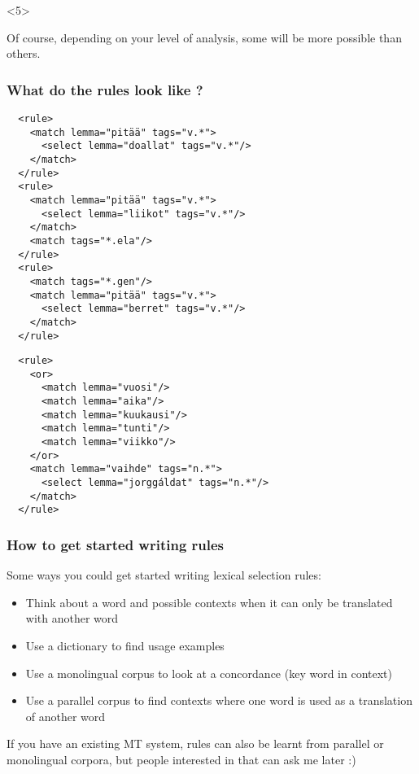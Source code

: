 \documentclass[10pt,xetex]{beamer} %
\begin{document}
\begin{frame}
\begin{onlyenv}<5>

Of course, depending on your level of analysis, some will be more possible than others.

\end{onlyenv}
\end{frame}

\begin{frame}[fragile]
  \frametitle{What do the rules look like ? }
\begin{multicols}{2}
\begin{small}
\begin{verbatim}
  <rule>
    <match lemma="pitää" tags="v.*">
      <select lemma="doallat" tags="v.*"/>
    </match>
  </rule>
  <rule>
    <match lemma="pitää" tags="v.*">
      <select lemma="liikot" tags="v.*"/>
    </match>
    <match tags="*.ela"/>
  </rule>
  <rule>
    <match tags="*.gen"/>
    <match lemma="pitää" tags="v.*">
      <select lemma="berret" tags="v.*"/>
    </match>
  </rule>
\end{verbatim}
\begin{verbatim}
  <rule>
    <or>
      <match lemma="vuosi"/>
      <match lemma="aika"/>
      <match lemma="kuukausi"/>
      <match lemma="tunti"/>
      <match lemma="viikko"/>
    </or>
    <match lemma="vaihde" tags="n.*">
      <select lemma="jorggáldat" tags="n.*"/>
    </match>
  </rule>
\end{verbatim}
\end{small}
\end{multicols}
\end{frame}


\begin{frame}
  \frametitle{How to get started writing rules}

Some ways you could get started writing lexical selection rules:

\begin{itemize}
  \item Think about a word and possible contexts when it can only be translated
    with another word
  \item Use a dictionary to find usage examples
  \item Use a monolingual corpus to look at a concordance (key word in context)
  \item Use a parallel corpus to find contexts where one word is used as a
    translation of another word
\end{itemize}

If you have an existing MT system, rules can also be learnt from parallel or monolingual
corpora,  but people interested in that can ask me later :)

\end{frame}
\end{document}
